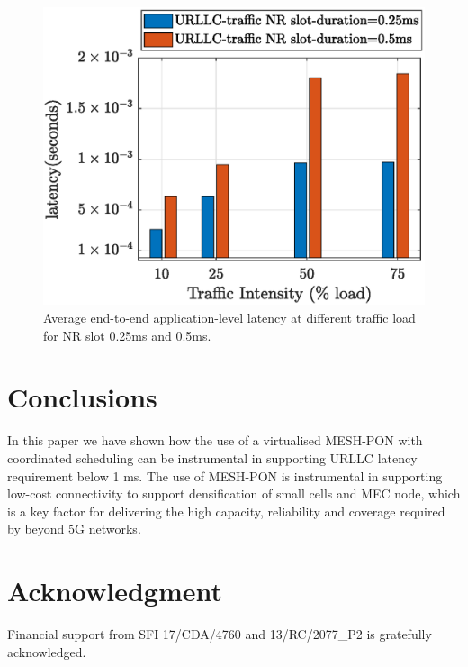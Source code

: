 \documentclass[a4paper, oneside, twocolumn, notitlepage, 10pt]{extarticle_ecoc}
\begin{document}
\begin{figure}[h]
	\centering
	\includegraphics[clip, trim={0 0 0 0}, width=\linewidth]{./Figures/tow-tiervPON_diffSolt.eps}
	\caption{Average end-to-end application-level latency at different traffic load for NR slot 0.25ms and 0.5ms.}
	\label{Fig:tow-tiervPON_diffSolt}
\end{figure}


\section{Conclusions} \label{sec:Conclusion}
In this paper we have shown how the use of a virtualised MESH-PON with coordinated scheduling can be instrumental in supporting URLLC latency requirement below 1 ms. The use of MESH-PON is instrumental in supporting low-cost connectivity to support densification of small cells and MEC node, which is a key factor for delivering the high capacity, reliability and coverage required by beyond 5G networks.

\section*{Acknowledgment} \label{sec:Acknowledgment}
	Financial support from SFI 17/CDA/4760 and 13/RC/2077\_P2 is gratefully acknowledged.
\end{document}
